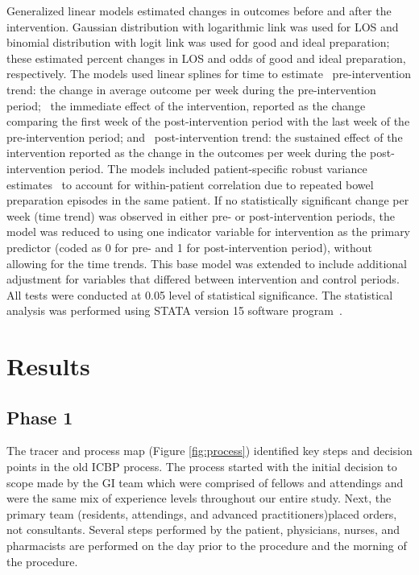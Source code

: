 \documentclass[Bprep]{subfiles}
\begin{document}
Generalized linear models estimated changes in outcomes before and after the intervention. Gaussian distribution with logarithmic link was used for LOS
and binomial distribution with logit link was used for good and ideal preparation; these estimated percent changes in LOS and odds of good and ideal preparation, respectively. The models used linear splines for time to estimate~\cite{Johnson2014-nm} pre-intervention trend: the change
in average outcome per week during the pre-intervention period;~\cite{Garber2019-rw} the immediate effect of the intervention, reported as the change comparing the first week of the post-intervention period with the last week of the pre-intervention period; and~\cite{Yadlapati2015-ej} post-intervention trend: the sustained effect of the intervention reported as the change in the outcomes per week during the post-intervention period. The models included patient-specific robust variance estimates~\cite{Rogers1994-ta} to account for within-patient correlation due to repeated bowel preparation episodes in the same patient. If no statistically significant change per week (time trend) was observed in either pre- or post-intervention periods, the model was reduced to using one indicator variable for intervention as the primary predictor (coded as 0 for pre- and 1 for post-intervention period), without allowing for the time trends. This base model was extended to include additional adjustment for variables that differed between intervention and control periods. All tests were conducted at 0.05 level of statistical significance. The statistical analysis was performed using STATA version 15 software program~\cite{StataCorp2017-tq}.\\

\section{Results}
\hypertarget{Results}{}
\subsection{Phase 1}\label{subsec:ResPhase1}
\hypertarget{Phase 1}{}

The tracer and process map (Figure \ref{fig:process}) identified key steps and decision points in the old ICBP process. The process started with the initial decision to scope made by the GI team which were comprised of fellows and attendings and were the same mix of experience levels throughout our entire study. Next, the primary team (residents, attendings, and advanced practitioners)placed orders, not consultants. Several steps performed by the patient, physicians, nurses, and pharmacists are performed on the day prior to the procedure and the morning of the procedure.\\
\end{document}
